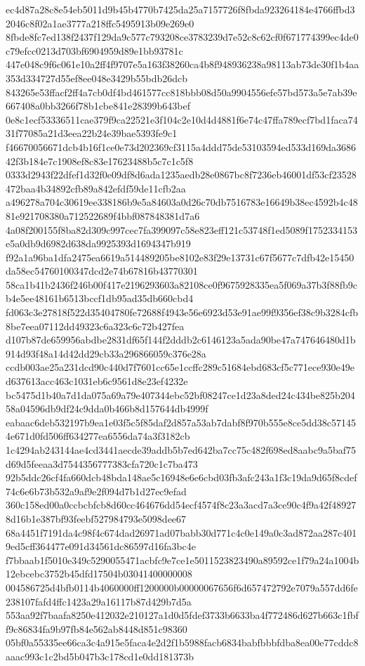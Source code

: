 \documentclass[11pt,a4paper]{article}
\begin{document}
{ec4d87a28c8e54eb5011d9b45b4770b7425da25a7157726f8fbda923264184e4766ffbd32046c8f02a1ae3777a218ffc5495913b09e269e0
8fbde8fc7ed138f2437f129da9c577c793208ce3783239d7e52c8c62cf0f671774399ec4de0c79efcc0213d703bf6904959d89e1bb93781c
447e048c9f6c061e10a2ff4f9707e5a163f38260ca4b8f948936238a98113ab73de30f1b4aa353d334727d55ef8ee048e3429b55bdb26dcb
843265e53ffacf2ff4a7cb0df4bd461577cc818bbb08d50a9904556efe57bd573a5e7ab39e667408a0bb3266f78b1cbe841e28399b643bef
0e8c1ecf53336511cae379f9ca22521e3f104c2e10d4d4881f6e74c47ffa789ecf7bd1faca7431f77085a21d3eea22b24e39bae5393fe9c1
f46670056671dcb4b16f1ce0e73d202369cf3115a4ddd75de53103594ed533d169da368642f3b184e7c1908ef8c83e17623488b5c7c1c5f8
0333d2943f22dfef1d32f0e09df8d6ada1235aedb28e0867bc8f7236eb46001df53cf23528472baa4b34892cfb89a842efdf59de11cfb2aa
a496278a704c30619ee338186b9e5a84603a0d26c70db7516783e16649b38ec4592b4c4881e921708380a712522689f4bbf087848381d7a6
4a08f200155f8ba82d309c997cec7fa399097c58e823eff121c53748f1ed5089f1752334153e5a0db9d6982d638da9925393d1694347b919
f92a1a96ba1dfa2475ea6619a514489205be8102e83f29e13731c67f5677c7dfb42e15450da58ec54760100347dcd2e74b67816b43770301
58ca1b41b2436f246b00f417e2196293603a82108ce0f9675928335ea5f069a37b3f88fb9cb4e5ee48161b6513bccf1db95ad35db660cbd4
fd063c3e27818f522d35404780fe72688f4943e56e6923d53e91ae99f9356ef38c9b3284cfb8be7eea07112dd49323c6a323c6c72b427fea
d107b87de659956abdbe2831df65f144f2dddb2c6146123a5ada90be47a747646480d1b914d93f48a14d42dd29cb33a296866059c376e28a
ccdb003ae25a231dcd90c440d7f7601cc65e1ccffc289c51684ebd683cf5c771ece930e49ed637613acc463c1031eb6c9561d8e23ef4232e
bc5475d1b40a7d1da075a69a79e407344ebc52bf08247ce1d23a8ded24c434be825b20458a04596db9df24c9dda0b466b8d157644db4999f
eabaac6deb532197b9ea1e03f5c5f85daf2d857a53ab7dabf8f970b555e8ce5dd38c571454e671d0fd506ff634277ea6556da74a3f3182cb
1c4294ab243144ae4cd3441aecde39addb5b7ed642ba7cc75c482f698ed8aabc9a5baf75d69d5feeaa3d7544356777383cfa720c1c7ba473
92b5ddc26cf4fa660dcb48bda148ae5c16948e6e6cbd03fb3afc243a1f3c19da9d65f8cdef74c6e6b73b532a9af9e2f094d7b1d27ec9efad
360c158ed00a0ccbcbfcb8d60cc464676dd54ecf4574f8c23a3acd7a3ce90c4f9a42f489278d16b1e387bf93feebf527984793e5098dee67
68a4451f7191da4c98f4c674dad26971ad07babb30d771c4c0e149a0c3ad872aa287c4019ed5cff364477e091d34561dc86597d16fa3bc4e
f7bbaab1f5010e349c5290055471acbfc9e7ce1e5011523823490a89592ce1f79a24a1004b12ebcebc3752b45dfd17504b03041400000008
004586725d4bfb0114b4060000ff1200000b00000067656f6d657472792e7079a557dd6fe238107fafd4ffc1423a29a16117b87d429b7d5a
553aa92f7baafa8250e412032e210127a1d0d5fdef3733b6633ba4f772486d627b663c1fbff9c86834fa9b97fb84e562ab8448d851c98360
05bf0a55335ee66ca3c4a915e5faca4e2d2f1b5988facb6834babfbbbfdba8ea00e77cddc8aaac993c1c2bd5b047b3c178cd1e0dd181373b
}
\end{document}
